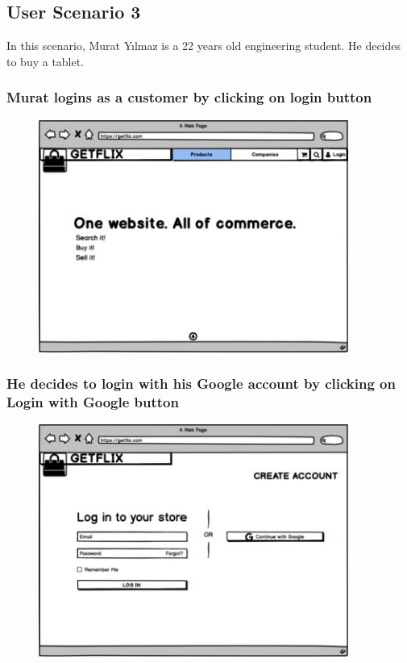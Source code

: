 \documentclass[]{article}
\begin{document}
\hypertarget{user-scenario-3}{%
    \subsection{User Scenario 3}\label{user-scenario-3}}

In this scenario, Murat Yılmaz is a 22 years old engineering student. He
decides to buy a tablet.

\hypertarget{murat-logins-as-a-customer-by-clicking-on-login-button}{%
    \subsubsection{Murat logins as a customer by clicking on login
        button}\label{murat-logins-as-a-customer-by-clicking-on-login-button}}

\begin{figure}[H]
    \centering
    \includegraphics[height=3in]{./images/33.jpg}
\end{figure}

\hypertarget{he-decides-to-login-with-his-google-account-by-clicking-on-login-with-google-button}{%
    \subsubsection{He decides to login with his Google account by clicking
        on Login with Google
        button}\label{he-decides-to-login-with-his-google-account-by-clicking-on-login-with-google-button}}


\begin{figure}[H]
    \centering
    \includegraphics[height=3in]{./images/34.jpg}
\end{figure}
\end{document}
